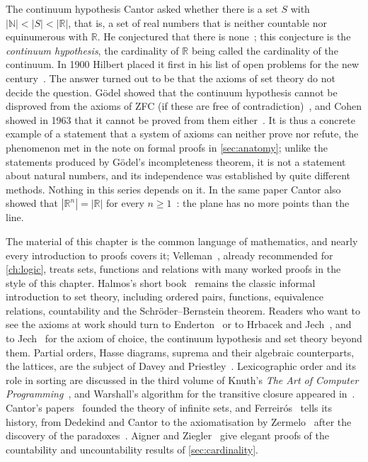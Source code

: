 \begin{note}{The continuum hypothesis}
Cantor asked whether there is a set $S$ with $|\mathbb N|<|S|<|\mathbb R|$, that is, a set of real numbers that is neither countable nor equinumerous with $\mathbb R$. He conjectured that there is none~\cite{cantor1878}; this conjecture is the \emph{continuum hypothesis}, the cardinality of $\mathbb R$ being called the cardinality of the continuum. In 1900 Hilbert placed it first in his list of open problems for the new century~\cite{hilbert1902}. The answer turned out to be that the axioms of set theory do not decide the question. G\"odel showed that the continuum hypothesis cannot be disproved from the axioms of ZFC (if these are free of contradiction)~\cite{godel1940}, and Cohen showed in 1963 that it cannot be proved from them either~\cite{cohen1963,cohen1964}. It is thus a concrete example of a statement that a system of axioms can neither prove nor refute, the phenomenon met in the note on formal proofs in \cref{sec:anatomy}; unlike the statements produced by G\"odel's incompleteness theorem, it is not a statement about natural numbers, and its independence was established by quite different methods. Nothing in this series depends on it. In the same paper Cantor also showed that $|\mathbb R^n|=|\mathbb R|$ for every $n\ge1$~\cite{cantor1878}: the plane has no more points than the line.
\end{note}

\chapternotes

The material of this chapter is the common language of mathematics, and nearly every introduction to proofs covers it; Velleman~\cite{velleman2019}, already recommended for \cref{ch:logic}, treats sets, functions and relations with many worked proofs in the style of this chapter. Halmos's short book~\cite{halmos1960naive} remains the classic informal introduction to set theory, including ordered pairs, functions, equivalence relations, countability and the Schr\"oder--Bernstein theorem. Readers who want to see the axioms at work should turn to Enderton~\cite{enderton1977sets} or to Hrbacek and Jech~\cite{hrbacek1999}, and to Jech~\cite{jech2003} for the axiom of choice, the continuum hypothesis and set theory beyond them. Partial orders, Hasse diagrams, suprema and their algebraic counterparts, the lattices, are the subject of Davey and Priestley~\cite{daveypriestley2002}. Lexicographic order and its role in sorting are discussed in the third volume of Knuth's \emph{The Art of Computer Programming}~\cite{knuth1998taocp3}, and Warshall's algorithm for the transitive closure appeared in~\cite{warshall1962}. Cantor's papers~\cite{cantor1874,cantor1878,cantor1891,cantor1895} founded the theory of infinite sets, and Ferreir\'os~\cite{ferreiros2007} tells its history, from Dedekind and Cantor to the axiomatisation by Zermelo~\cite{zermelo1904,zermelo1908} after the discovery of the paradoxes~\cite{russell1903,vanheijenoort1967}. Aigner and Ziegler~\cite{aigner2018proofs} give elegant proofs of the countability and uncountability results of \cref{sec:cardinality}.

\chapterreferences
